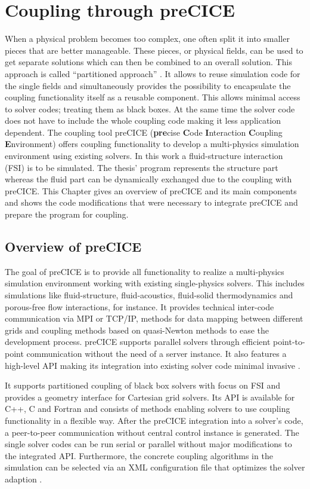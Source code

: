 \section{Coupling through preCICE}\label{sec:Coupl}
When a physical problem becomes too complex, one often split it into smaller pieces that are better manageable. These pieces, or physical fields, can be used to get separate solutions which can then be combined to an overall solution. This approach is called ``partitioned approach'' \cite{gatzhammer2015efficient}. It allows to reuse simulation code for the single fields and simultaneously provides the possibility to encapsulate the coupling functionality itself as a reusable component. This allows minimal access to solver codes; treating them as black boxes. At the same time the solver code does not have to include the whole coupling code making it less application dependent. The coupling tool preCICE (\textbf{pre}cise \textbf{C}ode \textbf{I}nteraction \textbf{C}oupling \textbf{E}nvironment) offers coupling functionality to develop a multi-physics simulation environment using existing solvers. In this work a fluid-structure interaction (FSI) is to be simulated. The thesis' program represents the structure part whereas the fluid part can be dynamically exchanged due to the coupling with preCICE. This Chapter gives an overview of preCICE and its main components and shows the code modifications that were necessary to integrate preCICE and prepare the program for coupling.

 \subsection{Overview of preCICE}\label{sec:Coupl-OverviewPreCICE}
  The goal of preCICE is to provide all functionality to realize a multi-physics simulation environment working with existing single-physics solvers. This includes simulations like fluid-structure, fluid-acoustics, fluid-solid thermodynamics and porous-free flow interactions, for instance. It provides technical inter-code communication via MPI or TCP/IP, methods for data mapping between different grids and coupling methods based on quasi-Newton methods to ease the development process. preCICE supports parallel solvers through efficient point-to-point communication without the need of a server instance. It also features a high-level API making its integration into existing solver code minimal invasive \cite{bungartz2015fully}.
  
  It supports partitioned coupling of black box solvers with focus on FSI and provides a geometry interface for Cartesian grid solvers. Its API is available for C++, C and Fortran and consists of methods enabling solvers to use coupling functionality in a flexible way. After the preCICE integration into a solver's code, a peer-to-peer communication without central control instance is generated. The single solver codes can be run serial or parallel without major modifications to the integrated API. Furthermore, the concrete coupling algorithms in the simulation can be selected via an XML configuration file that optimizes the solver adaption \cite{gatzhammer2015efficient}.
  
